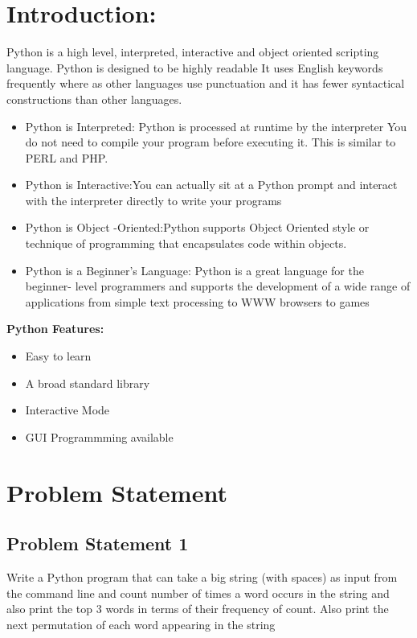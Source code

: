 \documentclass[10pt]{article}
\begin{document}
\section{Introduction:}
Python is a high level, interpreted, interactive and object oriented scripting
language. Python is designed to be highly readable It
uses English keywords
frequently where as other languages use punctuation
and it has fewer syntactical
constructions than other languages.
\begin{itemize}
\item{Python is Interpreted:
Python is processed at runtime by the interpreter You do not need to compile your program before executing it. This is similar to PERL and PHP.}
\item{Python is Interactive:You can actually sit at a Python prompt and interact with the interpreter directly to write your programs}
\item{Python is Object -Oriented:Python supports Object
Oriented style or technique of programming that encapsulates code within objects.}
\item{Python is a Beginner's Language: Python is a great language for the beginner-
level programmers and supports the development of a wide range of applications from simple text processing to WWW browsers to games}
\end{itemize}



\textbf{Python Features:}
\bigskip

 

\begin{itemize}
\item{ Easy to learn}
\item{A broad standard library}
\item{Interactive Mode}
\item{ GUI Programmming available}

\end{itemize} 








\newpage

\section{Problem Statement}
\subsection{Problem Statement 1}
Write a Python program that can take a big string (with spaces) as input from the command line and count number of times a word occurs in the string and also print the top 3 words in terms of their frequency of count.
Also print the next permutation of each word appearing in the string
\end{document}

